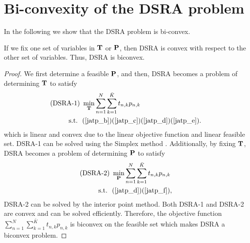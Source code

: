 \documentclass[journal]{IEEEtran} \ifCLASSINFOpdf
\begin{document}
\section{Bi-convexity of the DSRA problem}
\label{appendix-biconvex}
In the following we show that the DSRA problem is bi-convex.
\begin{theorem} \label{thm_biconvex}
If we fix one set of variables in $\bf{T}$ or $\bf{P}$, then DSRA is convex with respect to the other set of variables. Thus, DSRA is biconvex.
\end{theorem}
\begin{proof}
We first determine a feasible $\bf{P}$, and then, DSRA becomes a problem of determining $\bf{T}$ to satisfy
\begin{subequations} \notag
\label{opt_givenP}
\begin{align}
 \mbox{(DSRA-1)}~&\min_{\bf{T}}
   \begin{aligned}[t]
        \sum_{n=1}^N \sum_{k=1}^{\bar{K}} t_{n,k} p_{n,k}
   \end{aligned}  \\
   \text{s.t.~~} &
     (\ref{jatp_b}) (\ref{jatp_c}) (\ref{jatp_d}) (\ref{jatp_e}). \notag
\end{align}
\end{subequations}
which is linear and convex due to the linear objective function and linear feasible set. DSRA-1 can be solved using the Simplex method \cite{Dantzig2003}. Additionally, by fixing $\bf{T}$, DSRA becomes a problem of determining $\bf{P}$ to satisfy
\begin{subequations} \notag
\label{opt_givenT}
\begin{align}
\mbox{(DSRA-2)}~ &\min_{\bf{P}}
   \begin{aligned}[t]
        \sum_{n=1}^N \sum_{k=1}^{\bar{K}} t_{n,k} p_{n,k}
   \end{aligned}  \\
   \text{s.t.~~} &
     (\ref{jatp_d}) (\ref{jatp_f}), \notag
\end{align}
\end{subequations}
DSRA-2 can be solved by the interior point method. Both DSRA-1 and DSRA-2 are convex and can be solved efficiently. Therefore, the objective function $\sum_{n=1}^N \sum_{k=1}^{\bar{K}} t_{n,k} p_{n,k}$ is biconvex on the feasible set which makes DSRA a biconvex problem.
\end{proof}
\end{document}
